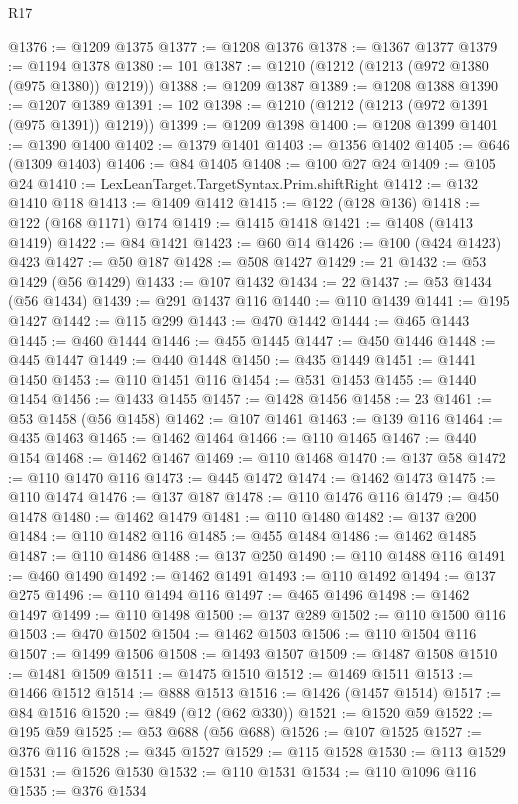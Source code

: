 \begin{lexlean}{R17}
\begin{coremodule}
@1376 := @1209 @1375
@1377 := @1208 @1376
@1378 := @1367 @1377
@1379 := @1194 @1378
@1380 := 101
@1387 := @1210 (@1212 (@1213 (@972 @1380 (@975 @1380)) @1219))
@1388 := @1209 @1387
@1389 := @1208 @1388
@1390 := @1207 @1389
@1391 := 102
@1398 := @1210 (@1212 (@1213 (@972 @1391 (@975 @1391)) @1219))
@1399 := @1209 @1398
@1400 := @1208 @1399
@1401 := @1390 @1400
@1402 := @1379 @1401
@1403 := @1356 @1402
@1405 := @646 (@1309 @1403)
@1406 := @84 @1405
@1408 := @100 @27 @24
@1409 := @105 @24
@1410 := LexLeanTarget.TargetSyntax.Prim.shiftRight
@1412 := @132 @1410 @118
@1413 := @1409 @1412
@1415 := @122 (@128 @136)
@1418 := @122 (@168 @1171) @174
@1419 := @1415 @1418
@1421 := @1408 (@1413 @1419)
@1422 := @84 @1421
@1423 := @60 @14
@1426 := @100 (@424 @1423) @423
@1427 := @50 @187
@1428 := @508 @1427
@1429 := 21
@1432 := @53 @1429 (@56 @1429)
@1433 := @107 @1432
@1434 := 22
@1437 := @53 @1434 (@56 @1434)
@1439 := @291 @1437 @116
@1440 := @110 @1439
@1441 := @195 @1427
@1442 := @115 @299
@1443 := @470 @1442
@1444 := @465 @1443
@1445 := @460 @1444
@1446 := @455 @1445
@1447 := @450 @1446
@1448 := @445 @1447
@1449 := @440 @1448
@1450 := @435 @1449
@1451 := @1441 @1450
@1453 := @110 @1451 @116
@1454 := @531 @1453
@1455 := @1440 @1454
@1456 := @1433 @1455
@1457 := @1428 @1456
@1458 := 23
@1461 := @53 @1458 (@56 @1458)
@1462 := @107 @1461
@1463 := @139 @116
@1464 := @435 @1463
@1465 := @1462 @1464
@1466 := @110 @1465
@1467 := @440 @154
@1468 := @1462 @1467
@1469 := @110 @1468
@1470 := @137 @58
@1472 := @110 @1470 @116
@1473 := @445 @1472
@1474 := @1462 @1473
@1475 := @110 @1474
@1476 := @137 @187
@1478 := @110 @1476 @116
@1479 := @450 @1478
@1480 := @1462 @1479
@1481 := @110 @1480
@1482 := @137 @200
@1484 := @110 @1482 @116
@1485 := @455 @1484
@1486 := @1462 @1485
@1487 := @110 @1486
@1488 := @137 @250
@1490 := @110 @1488 @116
@1491 := @460 @1490
@1492 := @1462 @1491
@1493 := @110 @1492
@1494 := @137 @275
@1496 := @110 @1494 @116
@1497 := @465 @1496
@1498 := @1462 @1497
@1499 := @110 @1498
@1500 := @137 @289
@1502 := @110 @1500 @116
@1503 := @470 @1502
@1504 := @1462 @1503
@1506 := @110 @1504 @116
@1507 := @1499 @1506
@1508 := @1493 @1507
@1509 := @1487 @1508
@1510 := @1481 @1509
@1511 := @1475 @1510
@1512 := @1469 @1511
@1513 := @1466 @1512
@1514 := @888 @1513
@1516 := @1426 (@1457 @1514)
@1517 := @84 @1516
@1520 := @849 (@12 (@62 @330))
@1521 := @1520 @59
@1522 := @195 @59
@1525 := @53 @688 (@56 @688)
@1526 := @107 @1525
@1527 := @376 @116
@1528 := @345 @1527
@1529 := @115 @1528
@1530 := @113 @1529
@1531 := @1526 @1530
@1532 := @110 @1531
@1534 := @110 @1096 @116
@1535 := @376 @1534

\end{coremodule}
\end{lexlean}
